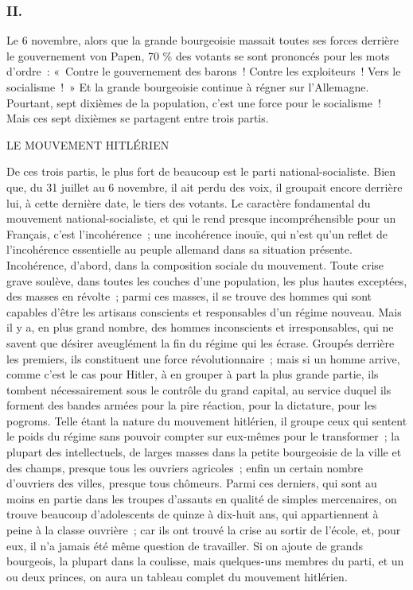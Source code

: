 \documentclass[french,twoside]{book} %
\begin{document}
\subsubsection[II.]{II.}
\noindent Le 6 novembre, alors que la grande bourgeoisie massait toutes ses forces derrière le gouvernement von Papen, 70 \% des votants se sont prononcés pour les mots d'ordre : « Contre le gouvernement des barons ! Contre les exploi­teurs ! Vers le socialisme ! » Et la grande bourgeoisie continue à régner sur l'Allemagne. Pourtant, sept dixièmes de la population, c'est une force pour le socialisme ! Mais ces sept dixièmes se partagent entre trois partis.\par

\begin{center}
LE MOUVEMENT HITLÉRIEN\end{center}
\noindent De ces trois partis, le plus fort de beaucoup est le parti national-socialiste. Bien que, du 31 juillet au 6 novembre, il ait perdu des voix, il groupait encore derrière lui, à cette dernière date, le tiers des votants. Le caractère fondamen­tal du mouvement national-socialiste, et qui le rend presque incompréhensible pour un Français, c'est l'incohérence ; une incohérence inouïe, qui n'est qu'un reflet de l'incohérence essentielle au peuple allemand dans sa situation présente. Incohérence, d'abord, dans la composition sociale du mouvement. Toute crise grave soulève, dans toutes les couches d'une population, les plus hautes exceptées, des masses en révolte ; parmi ces masses, il se trouve des hommes qui sont capables d'être les artisans conscients et responsables d'un régime nouveau. Mais il y a, en plus grand nombre, des hommes inconscients et irresponsables, qui ne savent que désirer aveuglément la fin du régime qui les écrase. Groupés derrière les premiers, ils constituent une force révolution­naire ; mais si un homme arrive, comme c'est le cas pour Hitler, à en grouper à part la plus grande partie, ils tombent nécessairement sous le contrôle du grand capital, au service duquel ils forment des bandes armées pour la pire réaction, pour la dictature, pour les pogroms. Telle étant la nature du mouvement hitlérien, il groupe ceux qui sentent le poids du régime sans pou­voir compter sur eux-mêmes pour le transformer ; la plupart des intellectuels, de larges masses dans la petite bourgeoisie de la ville et des champs, presque tous les ouvriers agricoles ; enfin un certain nombre d'ouvriers des villes, presque tous chômeurs. Parmi ces derniers, qui sont au moins en partie dans les troupes d'assauts en qualité de simples mercenaires, on trouve beaucoup d'adolescents de quinze à dix-huit ans, qui appartiennent à peine à la classe ouvrière ; car ils ont trouvé la crise au sortir de l'école, et, pour eux, il n'a jamais été même question de travailler. Si on ajoute de grands bourgeois, la plupart dans la coulisse, mais quelques-uns membres du parti, et un ou deux princes, on aura un tableau complet du mouvement hitlérien.\par
\end{document}
